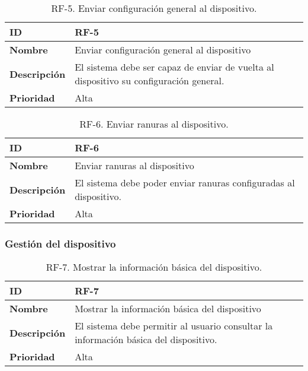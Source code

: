 \begin{table}[h!]
    \centering
    \caption{RF-5. Enviar configuración general al dispositivo.}
    \begin{tabular}{|m{2.5cm}|m{9.27cm}|}
        \hline
        \textbf{ID} & RF-5 \\
        \hline
        \textbf{Nombre} & Enviar configuración general al dispositivo \\
        \hline
        \textbf{Descripción} & El sistema debe ser capaz de enviar de vuelta al dispositivo su configuración general. \\
        \hline
        \textbf{Prioridad} & Alta \\
        \hline
    \end{tabular}
\end{table}

\begin{table}[h!]
    \centering
    \caption{RF-6. Enviar ranuras al dispositivo.}
    \begin{tabular}{|m{2.5cm}|m{9.27cm}|}
        \hline
        \textbf{ID} & RF-6 \\
        \hline
        \textbf{Nombre} & Enviar ranuras al dispositivo \\
        \hline
        \textbf{Descripción} & El sistema debe poder enviar ranuras configuradas al dispositivo. \\
        \hline
        \textbf{Prioridad} & Alta \\
        \hline
    \end{tabular}
\end{table}

\subsubsection{Gestión del dispositivo}

\begin{table}[h!]
    \centering
    \caption{RF-7. Mostrar la información básica del dispositivo.}
    \begin{tabular}{|m{2.5cm}|m{9.27cm}|}
        \hline
        \textbf{ID} & RF-7 \\
        \hline
        \textbf{Nombre} & Mostrar la información básica del dispositivo \\
        \hline
        \textbf{Descripción} & El sistema debe permitir al usuario consultar la información básica del dispositivo. \\
        \hline
        \textbf{Prioridad} & Alta \\
        \hline
    \end{tabular}
\end{table}

